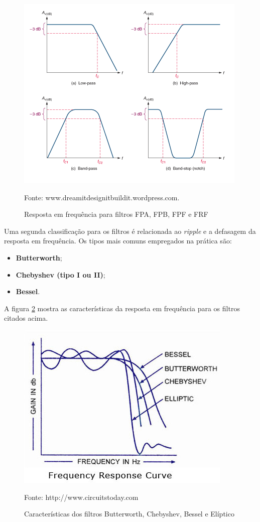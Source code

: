 \begin{figure}[!h]
  \centering
  \caption{Resposta em frequência para filtros FPA, FPB, FPF e FRF}
  \includegraphics[scale=0.6]{Imagens/types.png}
  
  \label{fig:tipos}
  \small Fonte: www.dreamitdesignitbuildit.wordpress.com.
\end{figure}

Uma segunda classificação para os filtros é relacionada ao \textit{ripple} e a defasagem da resposta em frequência. Os tipos mais comuns empregados na prática são:

\begin{itemize}
    \item \textbf{Butterworth};
    \item \textbf{Chebyshev (tipo I ou II)};
    \item \textbf{Bessel}.
\end{itemize}

A figura \ref{fig:tipos2} mostra as características da resposta em frequência 
para os filtros citados acima.

\begin{figure}
  \centering
  \caption{Características dos filtros Butterworth, Chebyshev, Bessel e 
  Elíptico}
  \includegraphics[scale=0.6]{Imagens/types2.jpg}
  
  \label{fig:tipos2}
  \small Fonte: http://www.circuitstoday.com
\end{figure}

